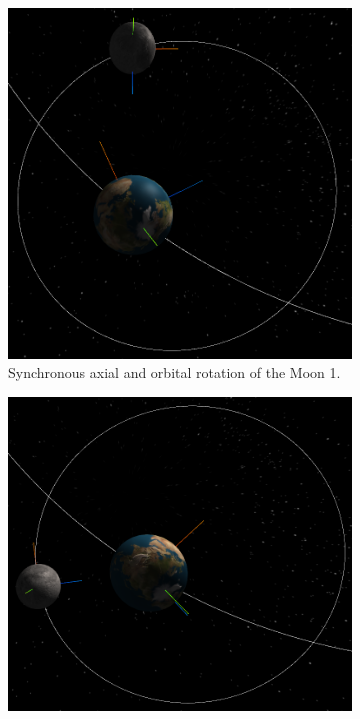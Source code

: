 \documentclass[12pt]{article}
\begin{document}
 \begin{figure}[H]
        \centering
        \begin{subfigure}[b]{0.38\textwidth}
                \includegraphics[width=\textwidth]{images/syncrotation1}
                \caption{Synchronous axial and orbital rotation of the Moon 1.}
                \label{fig: Synchronous axial and orbital rotation of the Moon.}
	 \end{subfigure}
        \begin{subfigure}[b]{0.38\textwidth}
                \includegraphics[width=\textwidth]{images/syncrotation2}

\end{subfigure}
\end{figure}
\end{document}
